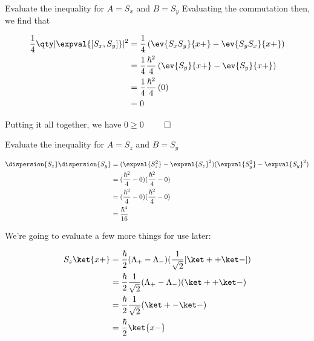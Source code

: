 \begin{answer}
\begin{answerpart}{Evaluate the inequality for \texorpdfstring{$A=S_x$}{A=Sx} and \texorpdfstring{$B=S_y$}{B=Sy}}
  Evaluating the commutation then, we find that

  \begin{equation}
    \begin{split}
      \frac{1}{4} \qty|\expval{[S_x,S_y]}|^2 &=
      \frac{1}{4} \left( \ev{S_xS_y}{x+} - \ev{S_yS_x}{x+} \right)\\
      &= \frac{1}{4} \frac{\hbar^2}{4} \left( \ev{S_y}{x+} - \ev{S_y}{x+} \right)\\
      &= \frac{1}{4} \frac{\hbar^2}{4} \left( 0 \right)\\
      &= 0
    \end{split}
  \end{equation}

  Putting it all together, we have $0 \ge 0$
  $\qed$
\end{answerpart}



\begin{answerpart}{Evaluate the inequality for \texorpdfstring{$A=S_z$ and $B=S_y$}{A=Sz and B=Sy}}

  \begin{equation}
    \begin{split}
      \dispersion{S_z}\dispersion{S_y} &= (\expval{S_z^2} - \expval{S_z}^2)(\expval{S_y^2} - \expval{S_y}^2)\\
      &= (\frac{\hbar^2}{4} - 0)(\frac{\hbar^2}{4} - 0)\\
      &= (\frac{\hbar^2}{4} - 0)(\frac{\hbar^2}{4} - 0)\\
      &= \frac{\hbar^4}{16}
    \end{split}
  \end{equation}

  We're going to evaluate a few more things for use later:

  \begin{equation}
    \begin{split}
      S_z\ket{x+} &= \frac{\hbar}{2}(\Lambda_+ - \Lambda_-)(\frac{1}{\sqrt{2}} [\ket + + \ket -])\\
      &= \frac{\hbar}{2}\frac{1}{\sqrt{2}}(\Lambda_+ - \Lambda_-)(\ket + + \ket -)\\
      &= \frac{\hbar}{2}\frac{1}{\sqrt{2}}(\ket + - \ket -)\\
      &= \frac{\hbar}{2}\ket{x-}\\
    \end{split}
  \end{equation}
    

\end{answerpart}
\end{answer}

